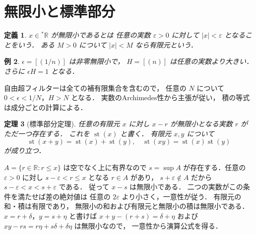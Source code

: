 \documentclass[a5paper,10pt,onecolumn]{jsarticle}
\makeatletter
\theoremstyle{mathnotetheorem}
\newtheorem{theorem}{定理}[section]
\newtheorem{definition}[theorem]{定義}
\newtheorem{example}[theorem]{例}
\renewcommand{\proofname}{証明}
\renewenvironment{proof}[1][\proofname]{%
  \par\pushQED{\qed}\normalfont\topsep4\p@\@plus2\p@\relax
  \trivlist\item[\hskip\labelsep\bfseries #1]\ignorespaces
}{\popQED\endtrivlist\@endpefalse}
\makeatother
\begin{document}
\section{無限小と標準部分}
\begin{definition}
$x\in{}^*\mathbb R$ が無限小であるとは
任意の実数 $\varepsilon>0$ に対して $|x|<\varepsilon$ となることをいう．
ある $M>0$ について $|x|<M$ なら有限元という．
\end{definition}
\begin{example}
$\epsilon=[(1/n)]$ は非零無限小で，
$H=[(n)]$ は任意の実数より大きい．
さらに $\epsilon H=1$ となる．
\end{example}
\begin{proof}
自由超フィルターは全ての補有限集合を含むので，
任意の $N$ について $0<\epsilon<1/N$，$H>N$ となる．
実数のArchimedes性から主張が従い，
積の等式は成分ごとの計算による．
\end{proof}
\begin{theorem}[標準部分定理]\label{thm:standard}
任意の有限元 $x$ に対し
$x-r$ が無限小となる実数 $r$ がただ一つ存在する．
これを $\operatorname{st}(x)$ と書く．
有限元 $x,y$ について
\[
 \operatorname{st}(x+y)=\operatorname{st}(x)+\operatorname{st}(y),\quad
 \operatorname{st}(xy)=\operatorname{st}(x)\operatorname{st}(y)
\]
が成り立つ．
\end{theorem}
\begin{proof}
$A=\{r\in\mathbb R:r\le x\}$ は空でなく上に有界なので
$s=\sup A$ が存在する．任意の $\varepsilon>0$ に対し
$s-\varepsilon<r\le x$ となる $r\in A$ があり，
$s+\varepsilon\notin A$ だから
$s-\varepsilon<x<s+\varepsilon$ である．
従って $x-s$ は無限小である．
二つの実数がこの条件を満たせば差の絶対値は
任意の $2\varepsilon$ より小さく，一意性が従う．
有限元の和・積は有限であり，
無限小の和および有限元と無限小の積は無限小である．
$x=r+\delta$，$y=s+\eta$ と書けば
$x+y-(r+s)=\delta+\eta$ および
$xy-rs=r\eta+s\delta+\delta\eta$ は無限小なので，
一意性から演算公式を得る．
\end{proof}
\end{document}
